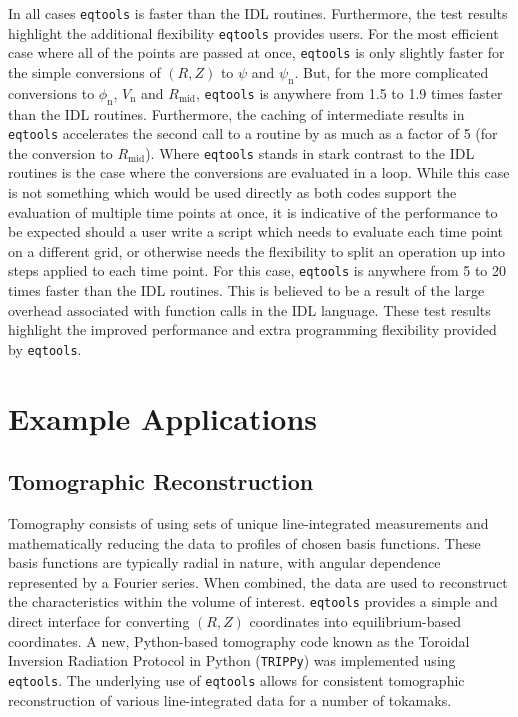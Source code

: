 \documentclass{elsarticle}
\newcommand{\eqtools}{\texttt{eqtools}\xspace}
\newcommand{\TRIPPy}{\texttt{TRIPPy}\xspace}
\begin{document}
In all cases \eqtools is faster than the IDL routines.
Furthermore, the test results highlight the additional flexibility \eqtools provides users.
For the most efficient case where all of the points are passed at once, \eqtools is only slightly faster for the simple conversions of $(R, Z)$ to $\psi$ and $\psi_{\text{n}}$.
But, for the more complicated conversions to $\phi_{\text{n}}$, $V_{\text{n}}$ and $R_{\text{mid}}$, \eqtools is anywhere from 1.5 to 1.9 times faster than the IDL routines.
Furthermore, the caching of intermediate results in \eqtools accelerates the second call to a routine by as much as a factor of 5 (for the conversion to $R_{\text{mid}}$).
Where \eqtools stands in stark contrast to the IDL routines is the case where the conversions are evaluated in a loop.
While this case is not something which would be used directly as both codes support the evaluation of multiple time points at once, it is indicative of the performance to be expected should a user write a script which needs to evaluate each time point on a different grid, or otherwise needs the flexibility to split an operation up into steps applied to each time point.
For this case, \eqtools is anywhere from 5 to 20 times faster than the IDL routines.
This is believed to be a result of the large overhead associated with function calls in the IDL language.
These test results highlight the improved performance and extra programming flexibility provided by \eqtools.

\section{Example Applications}
\label{sec:examples}

\subsection{Tomographic Reconstruction}

Tomography consists of using sets of unique line-integrated measurements and mathematically reducing the data to profiles of chosen basis functions.
These basis functions are typically radial in nature, with angular dependence represented by a Fourier series.
When combined, the data are used to reconstruct the characteristics within the volume of interest.
\eqtools provides a simple and direct interface for converting $(R, Z)$ coordinates into equilibrium-based coordinates.
A new, Python-based tomography code known as the Toroidal Inversion Radiation Protocol in Python (\TRIPPy) \cite{FaustTRIPPy} was implemented using \eqtools.
The underlying use of \eqtools allows for consistent tomographic reconstruction of various line-integrated data for a number of tokamaks.
\end{document}
